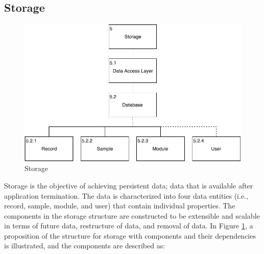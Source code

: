 \subsection{Storage}\label{soc:storage}

\begin{figure}
    \centering
    \includegraphics[scale=0.7]{images/Storage.pdf}
    \caption{Storage}
    \label{fig:hta_storage}
\end{figure}

Storage is the objective of achieving persistent data; data that is available after application termination. The data is characterized into four data entities (i.e., record, sample, module, and user) that contain individual properties.  The components in the storage structure are constructed to be extensible and scalable in terms of future data, restructure of data, and removal of data.  In Figure \ref{fig:hta_storage}, a proposition of the structure for storage with components and their dependencies is illustrated, and the components are described as:

